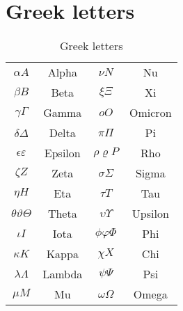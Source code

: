 \documentclass{article}
\begin{document}
\section{Greek letters}

\bgroup
\def\arraystretch{2}
\begin{table}[hbp]
  \centering
  \begin{tabular}{cccc}
  \hline
  	$\alpha A$				& Alpha		& $\nu N$		& Nu	\\
  	$\beta B$				& Beta		& $\xi \Xi$	&  Xi 		\\
  	$\gamma \Gamma$			& Gamma		& $o O$	& Omicron		\\
	$\delta \Delta$			& Delta 	& $\pi \Pi$	& Pi		\\
	$\epsilon \varepsilon $	& Epsilon	& $\rho\varrho P$ & Rho   \\
	$\zeta Z$				& Zeta		& $\sigma \Sigma$& Sigma  	\\
	$\eta H$				& Eta		& $\tau T$	& Tau  		\\  
	$\theta \vartheta \Theta$	& Theta & $\upsilon \Upsilon$ & Upsilon  \\
	$\iota I$				& Iota		& $\phi \varphi \Phi$ & Phi    \\
	$\kappa K$				& Kappa		& $\chi X$	& Chi  		\\
	$\lambda \Lambda$		& Lambda	& $\psi \Psi$	& Psi  	\\
	$\mu M$					& Mu 		& $\omega \Omega$ & Omega   \\
  
  \hline
  \end{tabular}
  \caption{Greek letters}
  \label{tab:symbol-variants}
\end{table}
\egroup
\end{document}
